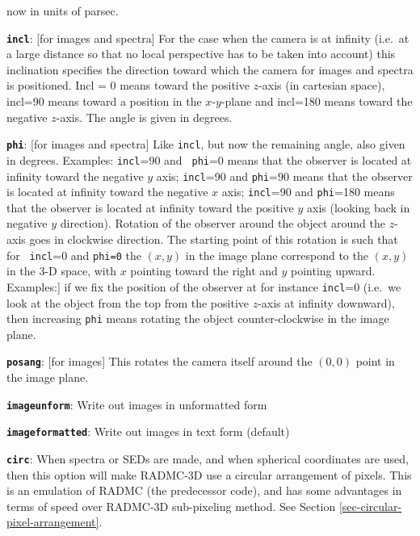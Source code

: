 \documentclass{report}
\newenvironment{options}%
  {\begin{list}{}{%
    \setlength{\topsep}{1em}%
    \setlength{\parskip}{0em}%
    \setlength{\parsep}{0em}%
    \setlength{\itemsep}{1em}%
    \setlength{\rightmargin}{0em}%
    \setlength{\leftmargin}{9em}%
    \setlength{\labelsep}{1em}%
    \setlength{\labelwidth}{6em}%
    \setlength{\itemindent}{0em}}\normalfont}%
  {\end{list}}
\begin{document}
\begin{options}
  now in units of parsec.
\item[{\small\tt\bf incl}:\hfill] [for images and spectra] For the case when the camera
  is at infinity (i.e.\ at a large distance so that no local perspective has
  to be taken into account) this inclination specifies the direction toward
  which the camera for images and spectra is positioned. Incl = 0 means
  toward the positive $z$-axis (in cartesian space), incl=90 means toward a
  position in the $x$-$y$-plane and incl=180 means toward the negative
  $z$-axis. The angle is given in degrees.
\item[{\small\tt\bf phi}:\hfill] [for images and spectra] Like {\small\tt incl}, but now the
  remaining angle, also given in degrees. Examples: {\small\tt incl}=90 and {\small\tt
    phi}=0 means that the observer is located at infinity toward the
  negative $y$ axis; {\small\tt incl}=90 and {\small\tt phi}=90 means that the observer
  is located at infinity toward the negative $x$ axis; {\small\tt incl}=90 and
  {\small\tt phi}=180 means that the observer is located at infinity toward the
  positive $y$ axis (looking back in negative $y$ direction). Rotation of
  the observer around the object around the $z$-axis goes in clockwise
  direction. The starting point of this rotation is such that for {\small\tt
    incl}=0 and {\small\tt phi=0} the $(x,y)$ in the image plane correspond to the
  $(x,y)$ in the 3-D space, with $x$ pointing toward the right and $y$
  pointing upward. Examples:\hfill] if we fix the position of the observer at for
  instance {\small\tt incl}=0 (i.e.\ we look at the object from the top from the
  positive $z$-axis at infinity downward), then increasing {\small\tt phi} means
  rotating the object counter-clockwise in the image plane.
\item[{\small\tt\bf posang}:\hfill] [for images] This rotates the camera itself around
  the $(0,0)$ point in the image plane. 
\item[{\small\tt\bf imageunform}:\hfill] Write out images in unformatted form
\item[{\small\tt\bf imageformatted}:\hfill] Write out images in text form (default)
\item[{\small\tt\bf circ}:\hfill] When spectra or SEDs are made, and when spherical
  coordinates are used, then this option will make RADMC-3D use a circular
  arrangement of pixels. This is an emulation of RADMC (the predecessor code),
  and has some advantages in terms of speed over RADMC-3D sub-pixeling method.
  See Section \ref{sec-circular-pixel-arrangement}.

\end{options}
\end{document}
